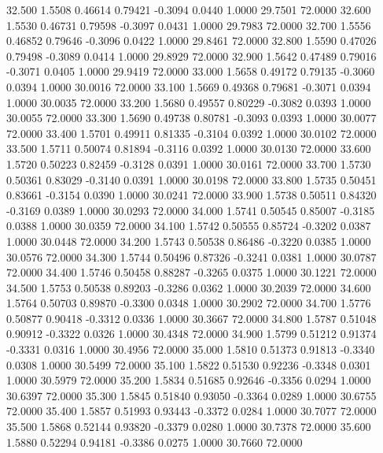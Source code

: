  32.500   1.5508   0.46614   0.79421  -0.3094   0.0440   1.0000  29.7501  72.0000
  32.600   1.5530   0.46731   0.79598  -0.3097   0.0431   1.0000  29.7983  72.0000
  32.700   1.5556   0.46852   0.79646  -0.3096   0.0422   1.0000  29.8461  72.0000
  32.800   1.5590   0.47026   0.79498  -0.3089   0.0414   1.0000  29.8929  72.0000
  32.900   1.5642   0.47489   0.79016  -0.3071   0.0405   1.0000  29.9419  72.0000
  33.000   1.5658   0.49172   0.79135  -0.3060   0.0394   1.0000  30.0016  72.0000
  33.100   1.5669   0.49368   0.79681  -0.3071   0.0394   1.0000  30.0035  72.0000
  33.200   1.5680   0.49557   0.80229  -0.3082   0.0393   1.0000  30.0055  72.0000
  33.300   1.5690   0.49738   0.80781  -0.3093   0.0393   1.0000  30.0077  72.0000
  33.400   1.5701   0.49911   0.81335  -0.3104   0.0392   1.0000  30.0102  72.0000
  33.500   1.5711   0.50074   0.81894  -0.3116   0.0392   1.0000  30.0130  72.0000
  33.600   1.5720   0.50223   0.82459  -0.3128   0.0391   1.0000  30.0161  72.0000
  33.700   1.5730   0.50361   0.83029  -0.3140   0.0391   1.0000  30.0198  72.0000
  33.800   1.5735   0.50451   0.83661  -0.3154   0.0390   1.0000  30.0241  72.0000
  33.900   1.5738   0.50511   0.84320  -0.3169   0.0389   1.0000  30.0293  72.0000
  34.000   1.5741   0.50545   0.85007  -0.3185   0.0388   1.0000  30.0359  72.0000
  34.100   1.5742   0.50555   0.85724  -0.3202   0.0387   1.0000  30.0448  72.0000
  34.200   1.5743   0.50538   0.86486  -0.3220   0.0385   1.0000  30.0576  72.0000
  34.300   1.5744   0.50496   0.87326  -0.3241   0.0381   1.0000  30.0787  72.0000
  34.400   1.5746   0.50458   0.88287  -0.3265   0.0375   1.0000  30.1221  72.0000
  34.500   1.5753   0.50538   0.89203  -0.3286   0.0362   1.0000  30.2039  72.0000
  34.600   1.5764   0.50703   0.89870  -0.3300   0.0348   1.0000  30.2902  72.0000
  34.700   1.5776   0.50877   0.90418  -0.3312   0.0336   1.0000  30.3667  72.0000
  34.800   1.5787   0.51048   0.90912  -0.3322   0.0326   1.0000  30.4348  72.0000
  34.900   1.5799   0.51212   0.91374  -0.3331   0.0316   1.0000  30.4956  72.0000
  35.000   1.5810   0.51373   0.91813  -0.3340   0.0308   1.0000  30.5499  72.0000
  35.100   1.5822   0.51530   0.92236  -0.3348   0.0301   1.0000  30.5979  72.0000
  35.200   1.5834   0.51685   0.92646  -0.3356   0.0294   1.0000  30.6397  72.0000
  35.300   1.5845   0.51840   0.93050  -0.3364   0.0289   1.0000  30.6755  72.0000
  35.400   1.5857   0.51993   0.93443  -0.3372   0.0284   1.0000  30.7077  72.0000
  35.500   1.5868   0.52144   0.93820  -0.3379   0.0280   1.0000  30.7378  72.0000
  35.600   1.5880   0.52294   0.94181  -0.3386   0.0275   1.0000  30.7660  72.0000
